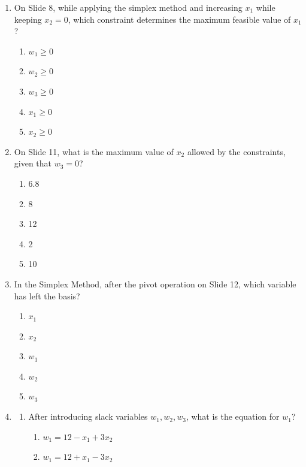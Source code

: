\documentclass{article}%
\begin{document}
\begin{enumerate}
\begin{enumerate}
\item $x_2$%
\item $x_1$%
\item $w_1$%
\item $w_2$%
\item $w_3$%
\end{enumerate}%
\vspace{1em}%
\item On Slide 8, while applying the simplex method and increasing $x_1$ while keeping $x_2 = 0$, which constraint determines the maximum feasible value of $x_1$?%
\begin{enumerate}%
\item $w_1 \ge 0$%
\item $w_2 \ge 0$%
\item $w_3 \ge 0$%
\item $x_1 \ge 0$%
\item $x_2 \ge 0$%
\end{enumerate}%
\vspace{1em}%
\item On Slide 11, what is the maximum value of $x_2$ allowed by the constraints, given that $w_3 = 0$?%
\begin{enumerate}%
\item 6.8%
\item 8%
\item 12%
\item 2%
\item 10%
\end{enumerate}%
\vspace{1em}%
\item In the Simplex Method, after the pivot operation on Slide 12, which variable has left the basis?%
\begin{enumerate}%
\item $x_1$%
\item $x_2$%
\item $w_1$%
\item $w_2$%
\item $w_3$%
\end{enumerate}%
\vspace{1em}%
\item%
\begin{enumerate}%
\item After introducing slack variables $w_1, w_2, w_3$, what is the equation for $w_1$?%
\begin{enumerate}%
\item $w_1 = 12 - x_1 + 3x_2$%
\item $w_1 = 12 + x_1 - 3x_2$%

\end{enumerate}
\end{enumerate}
\end{enumerate}
\end{document}
